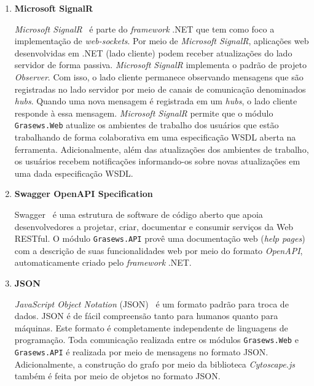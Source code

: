 \begin{enumerate}
  
  \item \textbf{Microsoft SignalR}
  
  \textit{Microsoft SignalR}~\cite{MICROSOFT-2019-SIGNALR} é parte do \textit{framework} .NET que tem como foco a implementação de \textit{web-sockets}. Por meio de \textit{Microsoft SignalR}, aplicações web desenvolvidas em .NET (lado cliente) podem receber atualizações do lado servidor de forma passiva. \textit{Microsoft SignalR} implementa o padrão de projeto \textit{Observer}. Com isso, o lado cliente permanece observando mensagens que são registradas no lado servidor por meio de canais de comunicação denominados \textit{hubs}. Quando uma nova mensagem é registrada em um \textit{hubs}, o lado cliente responde à essa mensagem. \textit{Microsoft SignalR} permite que o módulo \texttt{Grasews.Web} atualize os ambientes de trabalho dos usuários que estão trabalhando de forma colaborativa em uma especificação WSDL aberta na ferramenta. Adicionalmente, além das atualizações dos ambientes de trabalho, os usuários recebem notificações informando-os sobre novas atualizações em uma dada especificação WSDL.
  
  
  \item \textbf{Swagger OpenAPI Specification}
  
  Swagger~\cite{SMARTBEAR-2019-SWAGGER} é uma estrutura de software de código aberto que apoia desenvolvedores a projetar, criar, documentar e consumir serviços da Web RESTful. O módulo \texttt{Grasews.API} provê uma documentação web (\textit{help pages}) com a descrição de suas funcionalidades web por meio do formato \textit{OpenAPI}, automaticamente criado pelo \textit{framework} .NET.
  
  
  \item \textbf{JSON}
  
  \textit{JavaScript Object Notation} (JSON)~\cite{JSON-2019} é um formato padrão para troca de dados. JSON é de fácil compreensão tanto para humanos quanto para máquinas. Este formato é completamente independente de linguagens de programação. Toda comunicação realizada entre os módulos \texttt{Grasews.Web} e \texttt{Grasews.API} é realizada por meio de mensagens no formato JSON. Adicionalmente, a construção do grafo por meio da biblioteca \textit{Cytoscape.js} também é feita por meio de objetos no formato JSON.
  
\end{enumerate}

